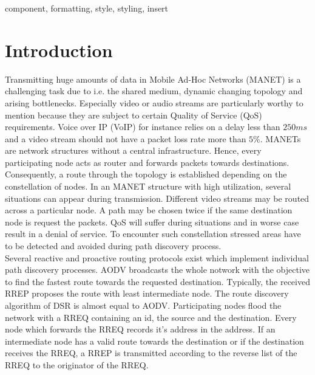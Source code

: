 \documentclass[conference]{IEEEtran}
\newcommand{\MANET}{MANET}
\newcommand{\QOS}{QoS}
\begin{document}
\begin{IEEEkeywords}
component, formatting, style, styling, insert
\end{IEEEkeywords}

\section{Introduction}
Transmitting huge amounts of data in Mobile Ad-Hoc Networks (MANET) is a challenging task due to i.e. the shared medium, dynamic changing topology and arising bottlenecks. Especially video or audio streams are particularly worthy to mention because they are subject to certain Quality of Service (QoS) requirements. Voice over IP (VoIP) for instance relies on a delay less than $250ms$ and a video stream should not have a packet loss rate more than $5\%$. \MANET{s} are network structures without a central infrastructure. Hence, every participating node acts as router and forwards packets towards destinations. Consequently, a route through the topology is established depending on the constellation of nodes.  In an \MANET{} structure with high utilization, several situations can appear during transmission. Different video streams may be routed across a particular node. A path may be chosen twice if the same destination node is request the packets. \QOS{} will suffer during situations and in worse case result in a denial of service. To encounter such constellation stressed areas have to be detected and avoided during path discovery process.\\
Several reactive and proactive routing protocols exist which implement individual path discovery processes. AODV broadcasts the whole notwork with the objective to find the fastest route towards the requested destination. Typically, the received RREP proposes the route with least intermediate node. The route discovery algorithm of DSR is almost equal to AODV. Participating nodes flood the network with a RREQ containing an id, the source and the destination. Every node which forwards the RREQ records it's address in the address. If an intermediate node has a valid route towards the destination or if the destination receives the RREQ, a RREP is transmitted according to the reverse list of the RREQ to the originator of the RREQ.\\
\end{document}
